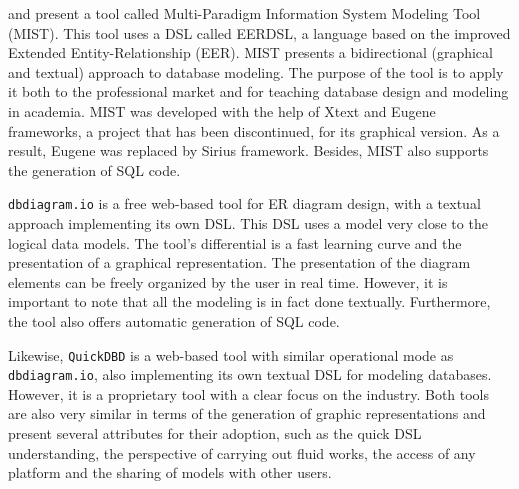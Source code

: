 \documentclass[a4paper,twoside,anonymous]{article}
\begin{document}
\cite{Celikovic:2014} and \cite{Dimitrieski:2015} present a tool called Multi-Paradigm Information System Modeling Tool (MIST).
This tool uses a DSL called EERDSL, a language based on the improved Extended Entity-Relationship (EER).
MIST presents a bidirectional (graphical and textual)  approach to database modeling.
The purpose of the tool is to apply it both to the professional market and for teaching database design and modeling in academia.
MIST was developed with the help of Xtext and Eugene frameworks, a project that has been discontinued, for its graphical version.
As a result, Eugene was replaced by Sirius framework.
Besides, MIST also supports the generation of SQL code.

\texttt{dbdiagram.io}
is a free web-based tool for ER diagram design, with a textual approach implementing its own DSL.
This DSL uses a model very close to the logical data models.
The tool's differential is a fast learning curve and the presentation of a graphical representation.
The presentation of the diagram elements can be freely organized by the user in real time.
However, it is important to note that all the modeling is in fact done textually.
Furthermore, the tool also offers automatic generation of SQL code.

Likewise, \texttt{QuickDBD}
is a web-based tool with similar operational mode as \texttt{dbdiagram.io}, also implementing its own textual DSL for modeling databases.
However, it is a proprietary tool with a clear focus on the industry.
Both tools are also very similar in terms of the generation of graphic representations and present several attributes for their adoption, such as the quick DSL understanding, the perspective of carrying out fluid works, the access of any platform and the sharing of models with other users.
\end{document}
